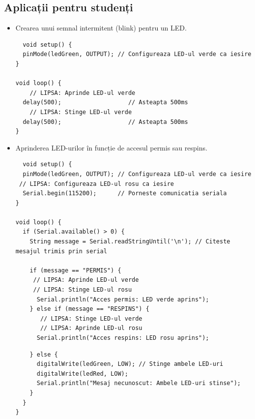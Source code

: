 \documentclass{report}
\begin{document}
\subsection*{Aplicații pentru studenți}
\begin{itemize}
    \item Crearea unui semnal intermitent (blink) pentru un LED.
    \begin{lstlisting}
  void setup() {
  pinMode(ledGreen, OUTPUT); // Configureaza LED-ul verde ca iesire
}

void loop() {
    // LIPSA: Aprinde LED-ul verde
  delay(500);                   // Asteapta 500ms
    // LIPSA: Stinge LED-ul verde
  delay(500);                   // Asteapta 500ms
}

    \end{lstlisting}
    \item Aprinderea LED-urilor în funcție de accesul permis sau respins.
    \begin{lstlisting}
  void setup() {
  pinMode(ledGreen, OUTPUT); // Configureaza LED-ul verde ca iesire
 // LIPSA: Configureaza LED-ul rosu ca iesire
  Serial.begin(115200);      // Porneste comunicatia seriala
}

void loop() {
  if (Serial.available() > 0) {
    String message = Serial.readStringUntil('\n'); // Citeste mesajul trimis prin serial

    if (message == "PERMIS") {
     // LIPSA: Aprinde LED-ul verde
     // LIPSA: Stinge LED-ul rosu
      Serial.println("Acces permis: LED verde aprins");
    } else if (message == "RESPINS") {
       // LIPSA: Stinge LED-ul verde
       // LIPSA: Aprinde LED-ul rosu
      Serial.println("Acces respins: LED rosu aprins");
      \end{lstlisting}
      \newpage
      \vspace*{1cm}
      \begin{lstlisting}
    } else {
      digitalWrite(ledGreen, LOW); // Stinge ambele LED-uri
      digitalWrite(ledRed, LOW);
      Serial.println("Mesaj necunoscut: Ambele LED-uri stinse");
    }
  }
}

    \end{lstlisting}
\end{itemize}
\end{document}
